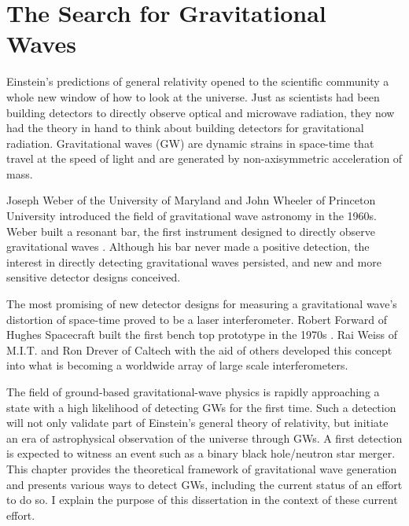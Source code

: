 \chapter{The Search for Gravitational Waves}


Einstein's predictions of general relativity opened to the scientific
community a whole new window of how to look at the universe. Just as
scientists had been building detectors to directly observe optical and
microwave radiation, they now had the theory in hand to think about
building detectors for gravitational radiation. Gravitational waves
(GW) are dynamic strains in space-time that travel at the speed of
light and are generated by non-axisymmetric acceleration of mass.

Joseph Weber of the University of Maryland and John Wheeler of
Princeton University introduced the field of gravitational wave
astronomy in the 1960s. Weber built a resonant bar, the first
instrument designed to directly observe gravitational waves
\cite{Weber1960Detection}. Although his bar never made a positive
detection, the interest in directly detecting gravitational waves
persisted, and new and more sensitive detector designs conceived.

The most promising of new detector designs for measuring a
gravitational wave's distortion of space-time proved to be a laser
interferometer. Robert Forward of Hughes Spacecraft built the first
bench top prototype in the 1970s \cite{Forward1978Wideband}. Rai Weiss
of M.I.T. and Ron Drever of Caltech with the aid of others developed
this concept into what is becoming a worldwide array of large scale
interferometers.

The field of ground-based gravitational-wave physics is rapidly
approaching a state with a high likelihood of detecting GWs for the
first time. Such a detection will not only validate part of Einstein's
general theory of relativity, but initiate an era of astrophysical
observation of the universe through GWs.  A first detection is
expected to witness an event such as a binary black hole/neutron star
merger. This chapter provides the theoretical framework of
gravitational wave generation and presents various ways to detect GWs,
including the current status of an effort to do so. I explain the
purpose of this dissertation in the context of these current effort.


